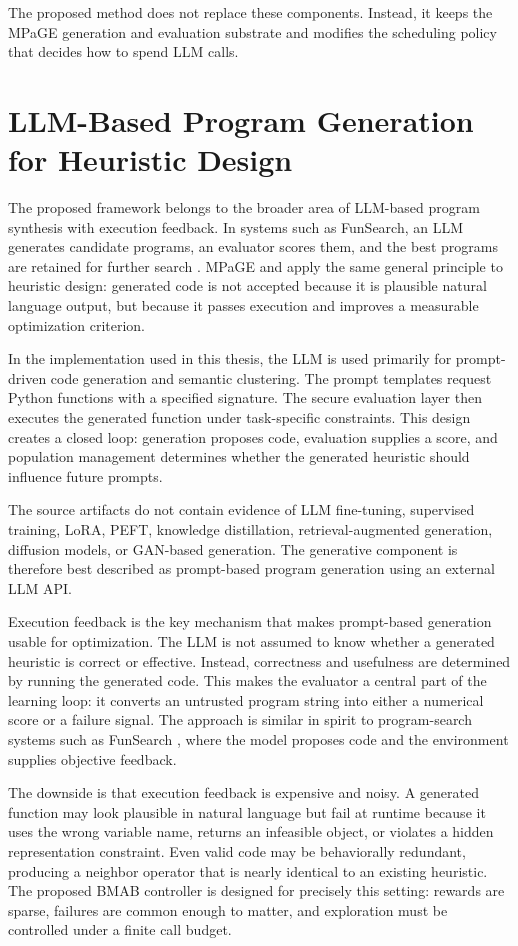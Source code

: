 \documentclass[../main.tex]{subfiles}
\begin{document}
The proposed \bmab{} method does not replace these components. Instead, it keeps the MPaGE generation and evaluation substrate and modifies the scheduling policy that decides how to spend LLM calls.

\section{LLM-Based Program Generation for Heuristic Design}

The proposed framework belongs to the broader area of LLM-based program synthesis with execution feedback. In systems such as FunSearch, an LLM generates candidate programs, an evaluator scores them, and the best programs are retained for further search \cite{romera2024funsearch}. MPaGE and \bmab{} apply the same general principle to heuristic design: generated code is not accepted because it is plausible natural language output, but because it passes execution and improves a measurable optimization criterion.

In the implementation used in this thesis, the LLM is used primarily for prompt-driven code generation and semantic clustering. The prompt templates request Python functions with a specified signature. The secure evaluation layer then executes the generated function under task-specific constraints. This design creates a closed loop: generation proposes code, evaluation supplies a score, and population management determines whether the generated heuristic should influence future prompts.

The source artifacts do not contain evidence of LLM fine-tuning, supervised training, LoRA, PEFT, knowledge distillation, retrieval-augmented generation, diffusion models, or GAN-based generation. The generative component is therefore best described as prompt-based program generation using an external LLM API.

Execution feedback is the key mechanism that makes prompt-based generation usable for optimization. The LLM is not assumed to know whether a generated heuristic is correct or effective. Instead, correctness and usefulness are determined by running the generated code. This makes the evaluator a central part of the learning loop: it converts an untrusted program string into either a numerical score or a failure signal. The approach is similar in spirit to program-search systems such as FunSearch \cite{romera2024funsearch}, where the model proposes code and the environment supplies objective feedback.

The downside is that execution feedback is expensive and noisy. A generated function may look plausible in natural language but fail at runtime because it uses the wrong variable name, returns an infeasible object, or violates a hidden representation constraint. Even valid code may be behaviorally redundant, producing a neighbor operator that is nearly identical to an existing heuristic. The proposed BMAB controller is designed for precisely this setting: rewards are sparse, failures are common enough to matter, and exploration must be controlled under a finite call budget.
\end{document}
